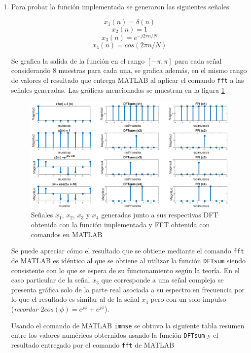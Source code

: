 \begin{enumerate}
    \item Para probar la función implementada se generaron las siguientes señales 
    
    $$ x_1(n) = \delta (n)$$
    $$ x_2(n) = 1$$
    $$ x_3(n) =e^{-j2 \pi n /N}$$
    $$ x_4(n) = cos(2\pi n /N)$$
    
    
    Se grafica la salida de la función en el rango $[-\pi, \pi]$ para cada señal considerando 8 muestras para cada una, se  grafica además, en el mismo rango de valores el resultado que entrega MATLAB al aplicar el comando \texttt{fft} a las señales generadas. Las gráficas mencionadas se muestran en la figura \ref{DFTsum}
    
    \begin{figure}[H]
        \centering
        \includegraphics[scale = 0.3]{Figuras/p4_1-DFTsum.eps}
        \caption{Señales $x_1$, $x_2$, $x_3$ y $x_4$ generadas junto a sus respectivas DFT obtenida con la función implementada y FFT obtenida con comandos en MATLAB}
        \label{DFTsum}
    \end{figure}


Se puede apreciar cómo el resultado que se obtiene mediante el comando \texttt{fft} de MATLAB es idéntico al que se obtiene al utilizar la función \texttt{DFTsum} siendo consistente con lo que se espera de su funcionamiento según la teoría. En el caso particular de la señal $x_3$ que corresponde a una señal compleja se presenta  gráfica solo de la parte real asociada a su espectro en frecuencia por lo que el resultado es similar al de la señal $x_4$ pero con un solo impulso (\textit{recordar $2cos(\phi) = e^{j\phi} + e^{j\phi}$}).


Usando el comando de MATLAB \texttt{immse} se obtuvo la siguiente tabla resumen entre los valores numéricos obternidos usando la función \texttt{DFTsum} y el resultado entregado por el comando \texttt{fft} de MATLAB



\end{enumerate}
